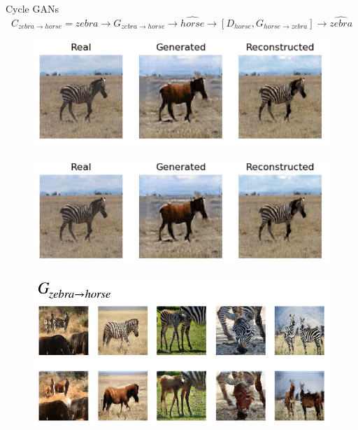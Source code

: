\begin{frame}[allowframebreaks]{Cycle GANs}
\framebreak
$$C_{zebra \rightarrow horse} = zebra \rightarrow G_{zebra \rightarrow horse} \rightarrow \hat{horse} \rightarrow [D_{horse}, G_{horse \rightarrow zebra}] \rightarrow \hat{zebra}$$
\begin{figure}
    \centering
    \includegraphics[height=0.7\textheight, width=\textwidth, keepaspectratio]{images/gan/cycle_gan_3.png}
\end{figure}

\framebreak
\begin{figure}
    \centering
    \includegraphics[height=0.7\textheight, width=\textwidth, keepaspectratio]{images/gan/cycle_gan_3.png}
\end{figure}

\framebreak
\begin{figure}
    \centering
    \includegraphics[height=0.9\textheight, width=\textwidth, keepaspectratio]{images/gan/cycle_gan_4.png}
\end{figure}


\end{frame}
